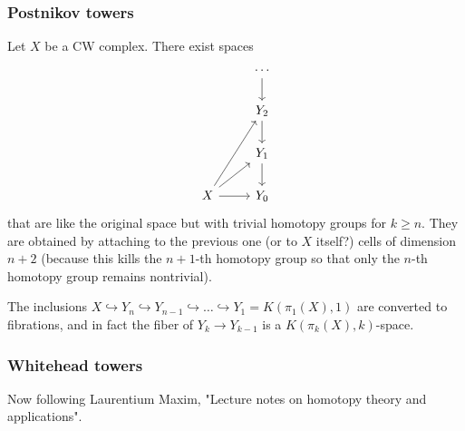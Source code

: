 \subsubsection*{Postnikov towers}
Let $X$ be a CW complex. There exist spaces
\[\begin{tikzcd}
	&\cdots\arrow[d]\\
	&Y_{2}\arrow[d]\\
	&Y_{1}\arrow[d]\\
	X\arrow[uur]\arrow[ur]\arrow[r]&Y_{0}
\end{tikzcd}\]
that are like the original space but with trivial homotopy groups for $k\geq n$. They are obtained by attaching to the previous one {\color{blue}(or to $X$ itself?)} cells of dimension $n+2$ (because this kills the $n+1$-th homotopy group so that only the $n$-th homotopy group remains nontrivial).

The inclusions $X\hookrightarrow Y_{n}\hookrightarrow Y_{n-1}\hookrightarrow \ldots\hookrightarrow Y_{1}=K(\pi_{1}(X),1)$ are converted to fibrations, and in fact the fiber of $Y_{k}\to Y_{k-1}$ is a $K(\pi_{k}(X),k)$-space.

\subsubsection*{Whitehead towers}

Now following Laurentium Maxim, "Lecture notes on homotopy theory and applications".

